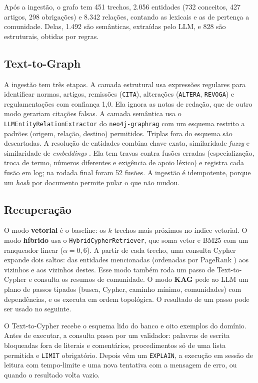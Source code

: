 \documentclass[12pt]{article}
\begin{document}
Após a ingestão, o grafo tem 451 trechos, 2.056 entidades (732 conceitos, 427 artigos, 298 obrigações) e 8.342
relações, contando as lexicais e as de pertença a comunidade. Delas, 1.492 são semânticas, extraídas pelo LLM, e 828 são estruturais, obtidas por regras.

\subsection{Text-to-Graph}

A ingestão tem três etapas. A camada estrutural usa expressões regulares para identificar normas, artigos,
remissões (\texttt{CITA}), alterações (\texttt{ALTERA}, \texttt{REVOGA}) e regulamentações com confiança 1,0.
Ela ignora as notas de redação, que de outro modo gerariam citações falsas. A camada semântica usa o
\texttt{LLMEntityRelationExtractor} do \texttt{neo4j-graphrag} com um esquema restrito a padrões
(origem, relação, destino) permitidos. Triplas fora do esquema são descartadas. A resolução de entidades
combina chave exata, similaridade \emph{fuzzy} e similaridade de \emph{embeddings} \cite{reimers2019sbert}. Ela
tem travas contra fusões erradas (especialização, troca de termo, números diferentes e exigência de apoio
léxico) e registra cada fusão em log; na rodada final foram 52 fusões. A ingestão é idempotente, porque um
\emph{hash} por documento permite pular o que não mudou.

\subsection{Recuperação}

O modo \textbf{vetorial} é o baseline: os $k$ trechos mais próximos no índice vetorial. O modo \textbf{híbrido}
usa o \texttt{HybridCypherRetriever}, que soma vetor e BM25 com um ranqueador linear ($\alpha = 0{,}6$). A partir de
cada trecho, uma consulta Cypher expande dois saltos: das entidades mencionadas (ordenadas por PageRank
\cite{page1999pagerank}) aos vizinhos e aos vizinhos destes. Esse modo também roda um passo de Text-to-Cypher e
consulta os resumos de comunidade. O modo \textbf{KAG} pede ao LLM um plano de passos tipados (busca, Cypher,
caminho mínimo, comunidades) com dependências, e os executa em ordem topológica. O resultado de um passo pode
ser usado no seguinte.

O Text-to-Cypher recebe o esquema lido do banco e oito exemplos do domínio. Antes de executar, a consulta passa
por um validador: palavras de escrita bloqueadas fora de literais e comentários, procedimentos só de uma
lista permitida e \texttt{LIMIT} obrigatório. Depois vêm um \texttt{EXPLAIN}, a execução em sessão de leitura com
tempo-limite e uma nova tentativa com a mensagem de erro, ou quando o resultado volta vazio.
\end{document}
